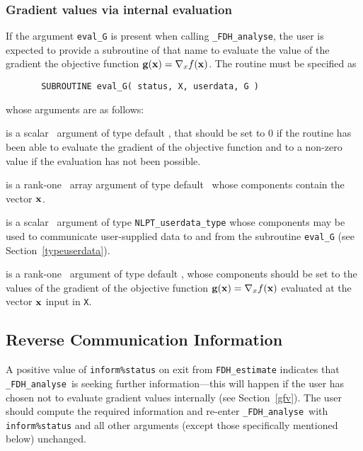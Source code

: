 \documentclass{galahad}
\newcommand{\packagename}{FDH}
\newcommand{\fullpackagename}{\libraryname\_\packagename}
\newcommand{\solver}{{\tt \fullpackagename\_analyse}}
\begin{document}

\subsubsection{Gradient values via internal evaluation\label{gfv}}

If the argument {\tt eval\_G} is present when calling \solver, the
user is expected to provide a subroutine of that name to evaluate the
value of the gradient the objective function ${\mathbf{g}}({\mathbf{x}}) = \nabla_x f({\mathbf{x}})$.
The routine must be specified as

\def\baselinestretch{0.8}
{\tt \begin{verbatim}
       SUBROUTINE eval_G( status, X, userdata, G )
\end{verbatim} }
\def\baselinestretch{1.0}
\noindent whose arguments are as follows:

\begin{description}
 is a scalar \intentout\ argument of type default \integer,
that should be set to 0 if the routine has been able to evaluate
the gradient of the objective function
and to a non-zero value if the evaluation has not been possible.

 is a rank-one \intentin\ array argument of type default \realdp\
whose components contain the vector ${\mathbf{x}}$.

 is a scalar \intentinout\ argument of type
{\tt NLPT\_userdata\_type} whose components may be used
to communicate user-supplied data to and from the subroutine {\tt eval\_G}
(see Section~\ref{typeuserdata}).

 is a rank-one \intentout\ argument of type default \realdp,
whose components should be set to the values of the gradient
of the objective function ${\mathbf{g}}({\mathbf{x}}) = \nabla_x f({\mathbf{x}})$
evaluated at the vector ${\mathbf{x}}$ input in {\tt X}.

\end{description}


\subsection{\label{reverse}Reverse Communication Information}

A positive value of {\tt inform\%status} on exit from
{\tt \packagename\_estimate}
indicates that
\solver\ is seeking further information---this will happen
if the user has chosen not to evaluate gradient
values internally (see Section~\ref{gfv}).
The user should compute the required information and re-enter \solver\
with {\tt inform\%status} and all other arguments (except those specifically
mentioned below) unchanged.
\end{document}
